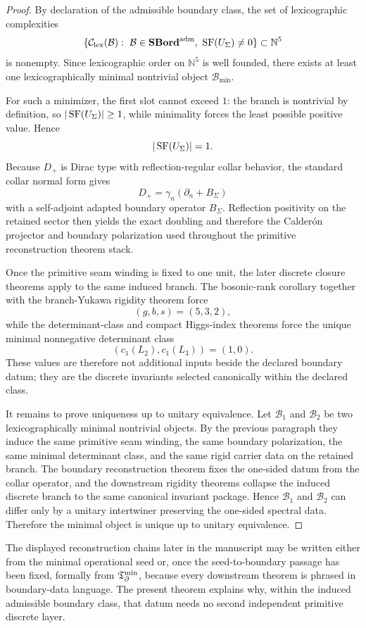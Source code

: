 \begin{proof}
By declaration of the admissible boundary class, the set of lexicographic complexities
\[
\{\mathcal C_{\mathrm{lex}}(\mathcal B):\ \mathcal B\in \mathbf{SBord}^{\mathrm{adm}},\ \SF(U_\Sigma)\neq 0\}
\subset \mathbb N^5
\]
is nonempty. Since lexicographic order on $\mathbb N^5$ is well founded, there exists at least one
lexicographically minimal nontrivial object $\mathcal B_{\min}$.

For such a minimizer, the first slot cannot exceed $1$: the branch is nontrivial by definition, so
$|\operatorname{SF}(U_\Sigma)|\ge 1$, while minimality forces the least possible positive value. Hence
\[
|\operatorname{SF}(U_\Sigma)|=1.
\]
Because $D_+$ is Dirac type with reflection-regular collar behavior, the standard collar normal form
gives
\[
D_+=\gamma_n(\partial_n+B_\Sigma)
\]
with a self-adjoint adapted boundary operator $B_\Sigma$. Reflection positivity on the retained
sector then yields the exact doubling and therefore the Calder\'on projector and boundary
polarization used throughout the primitive reconstruction theorem stack.

Once the primitive seam winding is fixed to one unit, the later discrete closure theorems apply to
the same induced branch. The bosonic-rank corollary together with the branch-Yukawa rigidity
theorem force
\[
(g,b,s)=(5,3,2),
\]
while the determinant-class and compact Higgs-index theorems force the unique minimal nonnegative
determinant class
\[
(c_1(L_2),c_1(L_3))=(1,0).
\]
These values are therefore not additional inputs beside the declared boundary datum; they are the
discrete invariants selected canonically within the declared class.

It remains to prove uniqueness up to unitary equivalence. Let $\mathcal B_1$ and $\mathcal B_2$ be
two lexicographically minimal nontrivial objects. By the previous paragraph they induce the same
primitive seam winding, the same boundary polarization, the same minimal determinant class, and the
same rigid carrier data on the retained branch. The boundary reconstruction theorem fixes the
one-sided datum from the collar operator, and the downstream rigidity theorems collapse the induced
discrete branch to the same canonical invariant package. Hence $\mathcal B_1$ and $\mathcal B_2$
can differ only by a unitary intertwiner preserving the one-sided spectral data. Therefore the
minimal object is unique up to unitary equivalence.
\end{proof}

\begin{remark}
The displayed reconstruction chains later in the manuscript may be written either from the minimal
operational seed or, once the seed-to-boundary passage has been fixed, formally from $\mathfrak T_{\partial}^{\min}$,
because every downstream theorem is phrased in boundary-data language. The present theorem explains
why, within the induced admissible boundary class, that datum needs no second independent primitive
discrete layer.
\end{remark}

